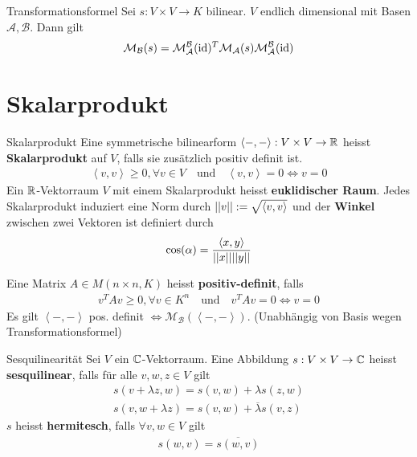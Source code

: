 \begin{satz}{Transformationsformel}
    Sei $s: V \times V \to K$ bilinear. $V$ endlich dimensional mit Basen $\mathcal{A}, \mathcal{B}$. Dann gilt 
    \begin{align*}
        \mathcal{M}_{\mathcal{B}}(s) = \mathcal{M}_{\mathcal{A}}^{\mathcal{B}}(\operatorname{id})^T \mathcal{M}_{\mathcal{A}}(s) \mathcal{M}_{\mathcal{A}}^{\mathcal{B}}(\operatorname{id})
    \end{align*}
\end{satz}

\section{Skalarprodukt}

\begin{definition}{Skalarprodukt}
    Eine symmetrische bilinearform $\left<-,-\right>: V \times V \to \mathbb{R}$ heisst \textbf{Skalarprodukt} auf $V$, falls sie zusätzlich positiv definit ist.
    \begin{align*}
        \left<v,v\right> \geq 0, \forall v \in V \quad \text{und} \quad \left<v,v\right> = 0 \Leftrightarrow v = 0
    \end{align*}
    Ein $\mathbb{R}$-Vektorraum $V$ mit einem Skalarprodukt heisst \textbf{euklidischer Raum}.
    Jedes Skalarprodukt induziert eine Norm durch $\vert\vert v\vert\vert:= \sqrt{\left<v,v\right>}$ und der \textbf{Winkel} zwischen zwei Vektoren ist definiert durch
    \begin{align*}
        \cos(\alpha) = \frac{\left<x,y\right>}{\vert\vert x\vert\vert \vert\vert y\vert\vert}
    \end{align*}
\end{definition}

Eine Matrix $A \in M(n\times n,K)$ heisst \textbf{positiv-definit}, falls
\begin{align*}
    v^TAv \geq 0, \forall v \in K^n \quad \text{und} \quad v^TAv = 0 \Leftrightarrow v = 0
\end{align*}
Es gilt $\left<-,-\right>$ pos. definit $\Leftrightarrow \mathcal{M}_{\mathcal{B}}(\left<-,-\right>)$. (Unabhängig von Basis wegen Transformationsformel)

\begin{definition}{Sesquilinearität}
    Sei $V$ ein $\mathbb{C}$-Vektorraum. Eine Abbildung $s: V \times V \to \mathbb{C}$ heisst \textbf{sesquilinear}, falls für alle $v,w,z \in V$ gilt
    \begin{align*}
        s(v + \lambda z,w) = s(v,w) + \lambda s(z,w)\\
        s(v, w + \lambda z) = s(v,w) + \overline{\lambda}s(v,z)
    \end{align*}
    $s$ heisst \textbf{hermitesch}, falls $\forall v,w \in V$ gilt
    \begin{align*}
        s(w,v) = \overline{s(w,v)}
    \end{align*}
\end{definition}

